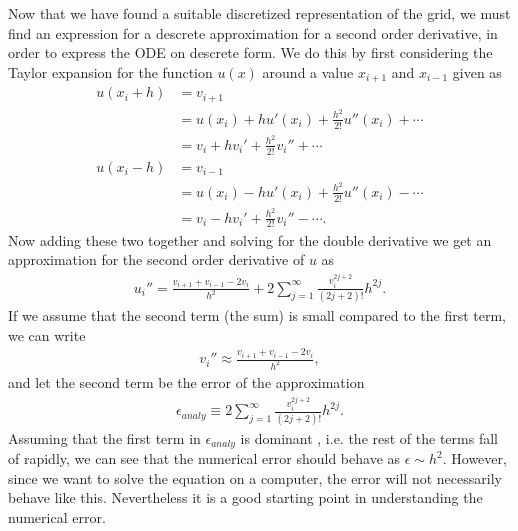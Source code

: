 \documentclass[twocolumn]{aastex62}
\begin{document}
Now that we have found a suitable discretized representation of the grid, we must find an expression for a descrete approximation for a second order derivative, in order to express the ODE on descrete form. We do this by first considering the Taylor expansion for the function $u(x)$ around a value $x_{i+1} $ and $x_{i-1}$ given as
\begin{align*}
	u(x_i + h) &= v_{i+1} \\
	&= u(x_i) + hu'(x_i) + \frac{h^2}{2!}u''(x_i) +\cdots\\
	&= v_i + hv_i' + \frac{h^2}{2!}v_i'' + \cdots\\
	u(x_i - h) &= v_{i-1} \\
	& = u(x_i) - hu'(x_i) + \frac{h^2}{2!}u''(x_i) -\cdots\\
	&= v_i - hv_i' + \frac{h^2}{2!}v_i'' - \cdots.
\end{align*} 
Now adding these two together and solving for the double derivative we get an approximation for the second order derivative of $u$ as 
\begin{align}
	u_i'' = \frac{v_{i+1} + v_{i-1} - 2v_i}{h^2} + 2\sum^\infty_{j=1} \frac{v_i^{2j+2}}{(2j + 2)!}h^{2j}.
\end{align}
If we assume that the second term (the sum) is small compared to the first term, we can write 
\begin{align}
	v_i''\approx \frac{v_{i+1} + v_{i-1} - 2v_i}{h^2},
\end{align}
and let the second term be the error of the approximation
\begin{align}
	\epsilon_{analy} \equiv 2\sum^\infty_{j=1} \frac{v_i^{2j+2}}{(2j + 2)!}h^{2j}.
	\label{eq:analy_error}
\end{align} Assuming that the first term in $\epsilon_{analy}$ is dominant , i.e. the rest of the terms fall of rapidly, we can see that the numerical error should behave as $\epsilon\sim h^2$. However, since we want to solve the equation on a computer, the error will not necessarily behave like this. Nevertheless it is a good starting point in understanding the numerical error. 
\end{document}
